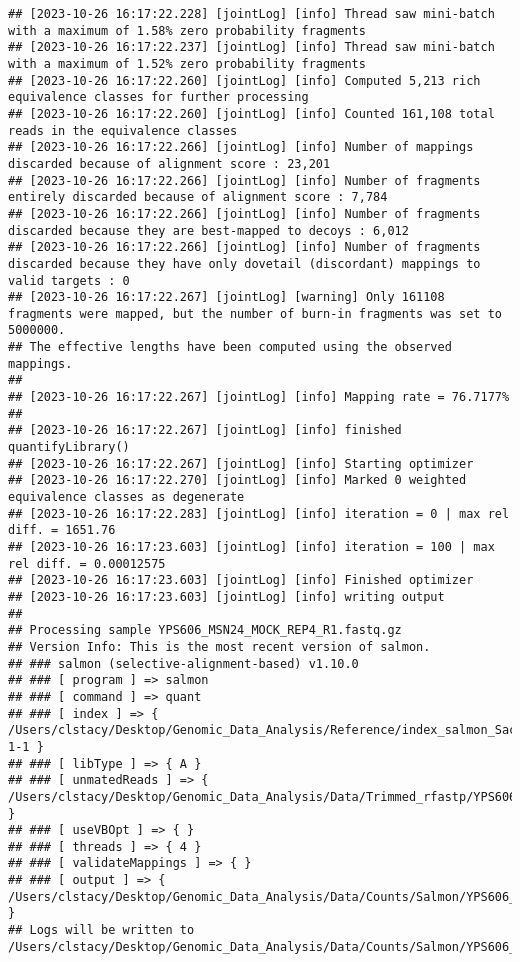 \documentclass[
]{book}
\begin{document}
\begin{verbatim}
## [2023-10-26 16:17:22.228] [jointLog] [info] Thread saw mini-batch with a maximum of 1.58% zero probability fragments
## [2023-10-26 16:17:22.237] [jointLog] [info] Thread saw mini-batch with a maximum of 1.52% zero probability fragments
## [2023-10-26 16:17:22.260] [jointLog] [info] Computed 5,213 rich equivalence classes for further processing
## [2023-10-26 16:17:22.260] [jointLog] [info] Counted 161,108 total reads in the equivalence classes 
## [2023-10-26 16:17:22.266] [jointLog] [info] Number of mappings discarded because of alignment score : 23,201
## [2023-10-26 16:17:22.266] [jointLog] [info] Number of fragments entirely discarded because of alignment score : 7,784
## [2023-10-26 16:17:22.266] [jointLog] [info] Number of fragments discarded because they are best-mapped to decoys : 6,012
## [2023-10-26 16:17:22.266] [jointLog] [info] Number of fragments discarded because they have only dovetail (discordant) mappings to valid targets : 0
## [2023-10-26 16:17:22.267] [jointLog] [warning] Only 161108 fragments were mapped, but the number of burn-in fragments was set to 5000000.
## The effective lengths have been computed using the observed mappings.
## 
## [2023-10-26 16:17:22.267] [jointLog] [info] Mapping rate = 76.7177%
## 
## [2023-10-26 16:17:22.267] [jointLog] [info] finished quantifyLibrary()
## [2023-10-26 16:17:22.267] [jointLog] [info] Starting optimizer
## [2023-10-26 16:17:22.270] [jointLog] [info] Marked 0 weighted equivalence classes as degenerate
## [2023-10-26 16:17:22.283] [jointLog] [info] iteration = 0 | max rel diff. = 1651.76
## [2023-10-26 16:17:23.603] [jointLog] [info] iteration = 100 | max rel diff. = 0.00012575
## [2023-10-26 16:17:23.603] [jointLog] [info] Finished optimizer
## [2023-10-26 16:17:23.603] [jointLog] [info] writing output 
## 
## Processing sample YPS606_MSN24_MOCK_REP4_R1.fastq.gz
## Version Info: This is the most recent version of salmon.
## ### salmon (selective-alignment-based) v1.10.0
## ### [ program ] => salmon 
## ### [ command ] => quant 
## ### [ index ] => { /Users/clstacy/Desktop/Genomic_Data_Analysis/Reference/index_salmon_Saccharomyces_cerevisiae.R64-1-1 }
## ### [ libType ] => { A }
## ### [ unmatedReads ] => { /Users/clstacy/Desktop/Genomic_Data_Analysis/Data/Trimmed_rfastp/YPS606_MSN24_MOCK_REP4_R1.fastq.gz }
## ### [ useVBOpt ] => { }
## ### [ threads ] => { 4 }
## ### [ validateMappings ] => { }
## ### [ output ] => { /Users/clstacy/Desktop/Genomic_Data_Analysis/Data/Counts/Salmon/YPS606_MSN24_MOCK_REP4_R1.fastq.gz_quant }
## Logs will be written to /Users/clstacy/Desktop/Genomic_Data_Analysis/Data/Counts/Salmon/YPS606_MSN24_MOCK_REP4_R1.fastq.gz_quant/logs

\end{verbatim}
\end{document}
